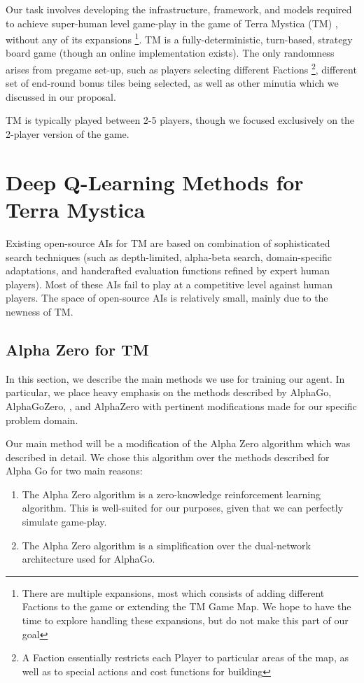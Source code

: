 \documentclass[12pt,twocolumn,letterpaper]{article}
\begin{document}
Our task involves developing the infrastructure, framework, and models required to achieve super-human level game-play in the game of Terra Mystica (TM) \cite{TMBoardGeek}, without any of its expansions \footnote{There are multiple expansions, most which consists of adding different Factions to the game or extending the TM Game Map. We hope to have the time to explore handling these expansions, but do not make this part of our goal}. TM is a fully-deterministic, turn-based, strategy board game (though an online implementation exists). The only randomness arises from pregame set-up, such as players selecting different Factions \footnote{A Faction essentially restricts each Player to particular areas of the map, as well as to special actions and cost functions for building}, different set of end-round bonus tiles being selected, as well as other minutia which we discussed in our proposal.

TM is typically played between 2-5 players, though we focused exclusively on the 2-player version of the game.


\section{Deep Q-Learning Methods for Terra Mystica}
\label{section:deep_qlearning_methods_for_tm}
Existing open-source AIs for TM are based on  combination of sophisticated search techniques (such as depth-limited, alpha-beta search, domain-specific adaptations, and handcrafted evaluation functions refined by expert human players). Most of these AIs fail to play at a competitive level against human players. The space of open-source AIs is relatively small, mainly due to the newness of TM.

\subsection{Alpha Zero for TM}
\label{subsection:alpha_zero_for_tm}
In this section, we describe the main methods we use for training our agent. In particular, we place heavy emphasis on the methods described by AlphaGo\cite{AlphaGo}, AlphaGoZero, \cite{AlphaGoZero}, and AlphaZero \cite{AlphaZero} with pertinent modifications made for our specific problem domain.

Our main method will be a modification of the Alpha Zero \cite{AlphaZero} algorithm which was described in detail. We chose this algorithm over the methods described for Alpha Go \cite{AlphaGo} for two main reasons:
\begin{enumerate}
    \item The Alpha Zero algorithm is a zero-knowledge reinforcement learning algorithm. This is well-suited for our purposes, given that we can perfectly simulate game-play. 
    \item The Alpha Zero algorithm is a simplification over the dual-network architecture used for AlphaGo.
\end{enumerate}
\end{document}
